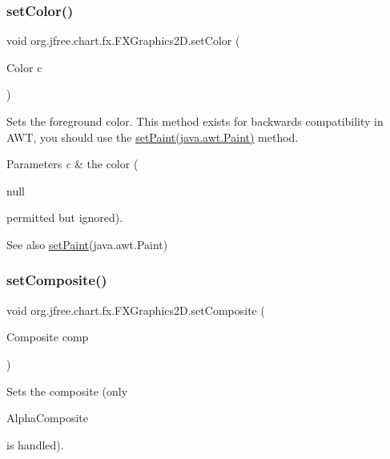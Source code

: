 \subsubsection{\texorpdfstring{set\+Color()}{setColor()}}
{\footnotesize\ttfamily void org.\+jfree.\+chart.\+fx.\+F\+X\+Graphics2\+D.\+set\+Color (\begin{DoxyParamCaption}\item[{Color}]{c }\end{DoxyParamCaption})}

Sets the foreground color. This method exists for backwards compatibility in A\+WT, you should use the \mbox{\hyperlink{}{set\+Paint(java.\+awt.\+Paint)}} method.


\begin{DoxyParams}{Parameters}
{\em c} & the color (
\begin{DoxyCode}
null 
\end{DoxyCode}
 permitted but ignored).\\
\hline
\end{DoxyParams}
\begin{DoxySeeAlso}{See also}
\mbox{\hyperlink{classorg_1_1jfree_1_1chart_1_1fx_1_1_f_x_graphics2_d_adad6db25635ffeb6e5684c12d2ca03aa}{set\+Paint}}(java.\+awt.\+Paint) 
\end{DoxySeeAlso}
\mbox{\label{classorg_1_1jfree_1_1chart_1_1fx_1_1_f_x_graphics2_d_acaccf830e2e26b3558ede1c13933365c}} 
\subsubsection{\texorpdfstring{set\+Composite()}{setComposite()}}
{\footnotesize\ttfamily void org.\+jfree.\+chart.\+fx.\+F\+X\+Graphics2\+D.\+set\+Composite (\begin{DoxyParamCaption}\item[{Composite}]{comp }\end{DoxyParamCaption})}

Sets the composite (only
\begin{DoxyCode}
AlphaComposite 
\end{DoxyCode}
 is handled).


